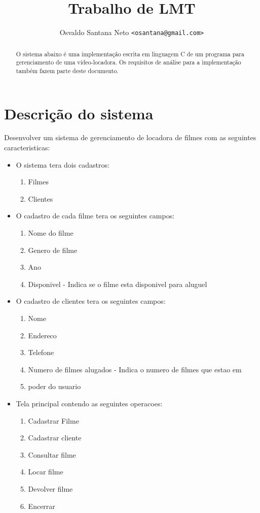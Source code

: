 \documentclass[a4paper,11pt]{article}
\begin{document}
\title{Trabalho de LMT}
\author{Osvaldo Santana Neto \texttt{\small <osantana@gmail.com>}}

\maketitle

\begin{abstract}
O sistema abaixo é uma implementação escrita em linguagem C de um programa para
gerenciamento de uma vídeo-locadora. Os requisitos de análise para a
implementação também fazem parte deste documento.
\end{abstract}

\section{Descrição do sistema}

Desenvolver um sistema de gerenciamento de locadora de filmes com as seguintes
caracteristicas:

\begin{itemize}
\item O sistema tera dois cadastros:
    \begin{enumerate}
    \item Filmes
    \item Clientes
    \end{enumerate}
\item O cadastro de cada filme tera os seguintes campos:
    \begin{enumerate}
    \item Nome do filme
    \item Genero de filme
    \item Ano
    \item Disponivel - Indica se o filme esta disponivel para aluguel
    \end{enumerate}
\item O cadastro de clientes tera os seguintes campos:
    \begin{enumerate}
    \item Nome
    \item Endereco
    \item Telefone
    \item Numero de filmes alugados - Indica o numero de filmes que estao em
    \item poder do usuario
    \end{enumerate}
\item Tela principal contendo as seguintes operacoes:
    \begin{enumerate}
    \item Cadastrar Filme
    \item Cadastrar cliente
    \item Consultar filme
    \item Locar filme
    \item Devolver filme
    \item Encerrar
    \end{enumerate}
\end{itemize}
\end{document}
